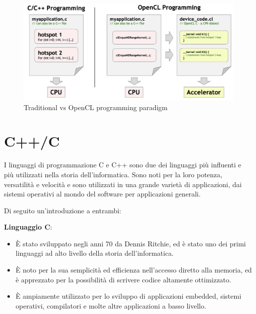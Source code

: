 \begin{figure}[h!]
    \centering
    \includegraphics[scale=0.3]{images/Capitolo2/5_im.png}
    \caption{Traditional vs OpenCL programming paradigm}
    \label{funzionamentoOpenCL}
\end{figure}

\clearpage

\section{C++/C}
\label{C++/C}
I linguaggi di programmazione C e C++ sono due dei linguaggi più influenti e più utilizzati nella storia dell'informatica. Sono noti per la loro potenza, versatilità e velocità e sono utilizzati in una grande varietà di applicazioni, dai sistemi operativi al mondo del software per applicazioni generali. 

\vspace{0,3cm}
\vspace{0,3cm}

\noindent Di seguito un'introduzione a entrambi:

\vspace{0,3cm}
\noindent \textbf{Linguaggio C}:
\begin{itemize}
    \item È stato sviluppato negli anni 70 da Dennis Ritchie, ed è stato uno dei primi linguaggi ad alto livello della storia dell'informatica.
    \item È noto per la sua semplicità ed efficienza nell'accesso diretto alla memoria, ed è apprezzato per la possibilità di scrivere codice altamente ottimizzato.
    \item È ampiamente utilizzato per lo sviluppo di applicazioni embedded, sistemi operativi, compilatori e molte altre applicazioni a basso livello.
\end{itemize}

